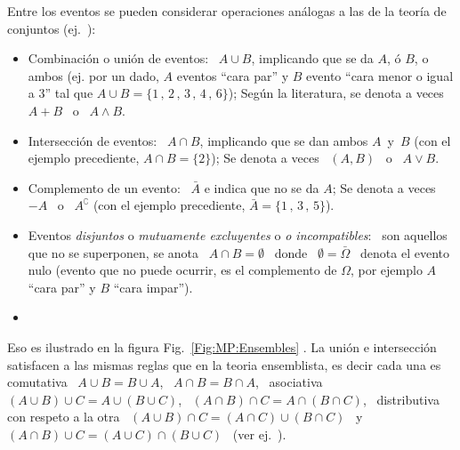 Entre  los eventos  se  pueden considerar  operaciones  an\'alogas a  las de  la
teor\'ia de  conjuntos (ej.~\cite{Spi76,  Bre88, ManWol95, Sie75,  Sie76, Bor98,
  Bor09}):
%
\begin{itemize}
\item Combinaci\'on  o uni\'on de  eventos: \ $A  \cup B$, implicando que  se da
  $A$, \'o $B$, o ambos (ej. por  un dado, $A$ eventos ``cara par'' y $B$ evento
  ``cara menor o igual a 3'' tal que $A \cup B = \{1 \, , \, 2 \, , \, 3 \, , \,
  4 \,  , \, 6\}$); Seg\'un la  literatura, se denota a  veces \ $A+B$ \  o \ $A
  \wedge B$.
%
\item  Intersecci\'on de  eventos:  \ $A\cap  B$,  implicando que  se dan  ambos
  $A$~y~$B$ (con  el ejemplo precediente,  $A \cap  B = \{  2 \}$); Se  denota a
  veces \ $(A,B)$ \ o \ $A \vee B$.
%
\item Complemento de un evento: \ $\bar{A}$ e indica que no se da $A$; Se denota
  a veces \ $-A$  \ o \ $A^\complement$ (con el ejemplo precediente, $\bar{A}  = \{ 1 \, ,
  \, 3 \, , \, 5 \}$).
%
\item  Eventos  {\it  disjuntos}  o   {\it  mutuamente  excluyentes}  o  {\it  o
    incompatibles}: \ son aquellos que no se  superponen, se anota \ $A \cap B =
  \emptyset$  \ donde  \  $\emptyset =  \bar{\Omega}$  \ denota  el evento  nulo
  (evento que no  puede ocurrir, es el complemento de  $\Omega$, por ejemplo $A$
  ``cara par'' y $B$ ``cara impar'').
%
\item {}
\end{itemize}
%
\noindent Eso es ilustrado en la figura Fig.~\ref{Fig:MP:Ensembles} .
La uni\'on  e intersecci\'on  satisfacen a  las mismas reglas  que en  la teoria
ensemblista, es decir cada una es comutativa \  $A \cup B = B \cup A$, \ $A \cap
B = B  \cap A$, \ asociativa \  $(A \cup B) \cup C  = A \cup (B \cup  C)$, \ $(A
\cap B) \cap C = A \cap (B \cap  C)$, \ distributiva con respeto a la otra \ $(A
\cup B) \cap C = (A \cap C) \cup (B \cap  C)$ \ y \ $(A \cap B) \cup C = (A \cup
C)  \cap  (B  \cup C)$  \  (ver  ej.~\cite{Jef48,  Jef73, Hal50,  Fel71,  Bre88,
  ManWol95, IbaPar97, LehCas98, AthLah06, Coh13, HogMck13}).

